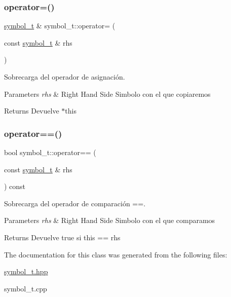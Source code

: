 \subsubsection{\texorpdfstring{operator=()}{operator=()}}
{\footnotesize\ttfamily \hyperlink{classsymbol__t}{symbol\+\_\+t} \& symbol\+\_\+t\+::operator= (\begin{DoxyParamCaption}\item[{const \hyperlink{classsymbol__t}{symbol\+\_\+t} \&}]{rhs }\end{DoxyParamCaption})}



Sobrecarga del operador de asignación. 


\begin{DoxyParams}{Parameters}
{\em rhs} & Right Hand Side Simbolo con el que copiaremos \\
\hline
\end{DoxyParams}
\begin{DoxyReturn}{Returns}
Devuelve $\ast$this 
\end{DoxyReturn}
\mbox{\label{classsymbol__t_a8b3f54fdd5cdea7dd7ff1a645933ed7f}} 
\subsubsection{\texorpdfstring{operator==()}{operator==()}}
{\footnotesize\ttfamily bool symbol\+\_\+t\+::operator== (\begin{DoxyParamCaption}\item[{const \hyperlink{classsymbol__t}{symbol\+\_\+t} \&}]{rhs }\end{DoxyParamCaption}) const}



Sobrecarga del operador de comparación ==. 


\begin{DoxyParams}{Parameters}
{\em rhs} & Right Hand Side Simbolo con el que comparamos \\
\hline
\end{DoxyParams}
\begin{DoxyReturn}{Returns}
Devuelve true si this == rhs 
\end{DoxyReturn}


The documentation for this class was generated from the following files\+:\begin{DoxyCompactItemize}
\item 
\hyperlink{symbol__t_8hpp}{symbol\+\_\+t.\+hpp}\item 
symbol\+\_\+t.\+cpp\end{DoxyCompactItemize}
